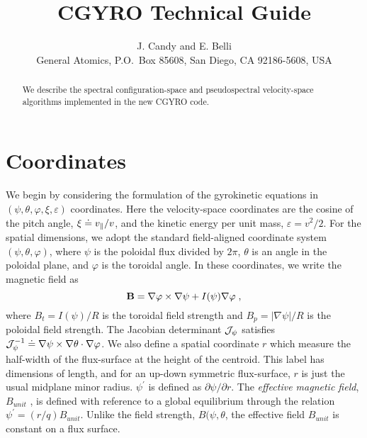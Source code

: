\documentclass[11pt]{article}
\begin{document}
\title{{\LARGE\bf CGYRO Technical Guide}}
\author{J. Candy and E. Belli \\
{\small General Atomics, P.O.~Box 85608, San Diego, CA 92186-5608, USA}}
\maketitle

\begin{abstract}
We describe the spectral configuration-space and pseudospectral velocity-space
algorithms implemented in the new CGYRO code. 
\end{abstract}

\section{Coordinates}
We begin by considering the formulation of the gyrokinetic equations in 
$(\psi,\theta,\varphi, \xi, \varepsilon)$ coordinates.  Here the velocity-space
coordinates are the cosine of the pitch angle, $\xi \doteq v_\parallel/v$, and the
kinetic energy per unit mass, $\varepsilon = v^2/2$. For the spatial 
dimensions, we adopt the standard field-aligned coordinate system
$(\psi,\theta,\varphi)$, where $\psi$ is the poloidal flux divided by 
$2 \pi$, $\theta$ is an angle in the poloidal plane, and $\varphi$ is 
the toroidal angle.  In these coordinates, we write the magnetic field as
%
\begin{equation}
\mathbf{B} = \nabla\varphi\times\nabla\psi + I(\psi) \nabla\varphi \; ,
\end{equation}
%
where $B_t = I(\psi)/R$ is the toroidal field strength and 
$B_p = |\nabla\psi|/R$ is the poloidal field strength. The Jacobian 
determinant ${\cal J}_\psi$ satisfies
${\cal J}_\psi^{-1} \doteq  {\nabla\psi\times\nabla\theta\cdot\nabla\varphi}$.  We
also define a spatial coordinate $r$ which measure the half-width of 
the flux-surface at the height of the centroid.  This label has 
dimensions of length, and for an up-down symmetric flux-surface, 
$r$ is just the usual midplane minor radius.  $\psi^\prime$ is defined as
$\partial \psi / \partial r$.  The {\sl effective magnetic field}, 
$B_{unit}$ \cite{candy:2009b}, is defined with reference to a global 
equilibrium through the relation $\psi^\prime = (r/q) B_{unit}$.  
Unlike the field strength, $B(\psi,\theta$, the effective field 
$B_{unit}$ is constant on a flux surface.

\newpage
\end{document}
